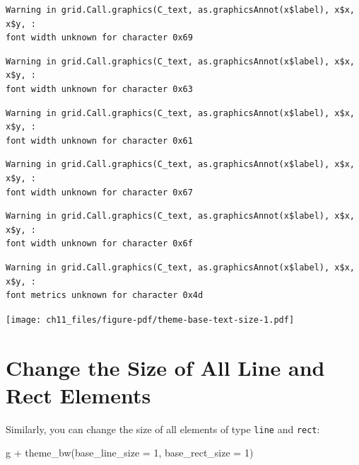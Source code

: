 \documentclass[
  letterpaper,
]{scrbook}
\newenvironment{Shaded}{\begin{snugshade}}{\end{snugshade}}
\newcommand{\AttributeTok}[1]{\textcolor[rgb]{0.40,0.45,0.13}{#1}}
\newcommand{\DecValTok}[1]{\textcolor[rgb]{0.68,0.00,0.00}{#1}}
\newcommand{\FunctionTok}[1]{\textcolor[rgb]{0.28,0.35,0.67}{#1}}
\newcommand{\NormalTok}[1]{\textcolor[rgb]{0.00,0.23,0.31}{#1}}
\newcommand{\SpecialCharTok}[1]{\textcolor[rgb]{0.37,0.37,0.37}{#1}}
\begin{document}
\begin{verbatim}
Warning in grid.Call.graphics(C_text, as.graphicsAnnot(x$label), x$x, x$y, :
font width unknown for character 0x69
\end{verbatim}

\begin{verbatim}
Warning in grid.Call.graphics(C_text, as.graphicsAnnot(x$label), x$x, x$y, :
font width unknown for character 0x63
\end{verbatim}

\begin{verbatim}
Warning in grid.Call.graphics(C_text, as.graphicsAnnot(x$label), x$x, x$y, :
font width unknown for character 0x61
\end{verbatim}

\begin{verbatim}
Warning in grid.Call.graphics(C_text, as.graphicsAnnot(x$label), x$x, x$y, :
font width unknown for character 0x67
\end{verbatim}

\begin{verbatim}
Warning in grid.Call.graphics(C_text, as.graphicsAnnot(x$label), x$x, x$y, :
font width unknown for character 0x6f
\end{verbatim}

\begin{verbatim}
Warning in grid.Call.graphics(C_text, as.graphicsAnnot(x$label), x$x, x$y, :
font metrics unknown for character 0x4d
\end{verbatim}

\texttt{[image: ch11\_files/figure-pdf/theme-base-text-size-1.pdf]}

\section{Change the Size of All Line and Rect
Elements}\label{change-the-size-of-all-line-and-rect-elements}

Similarly, you can change the size of all elements of type \texttt{line}
and \texttt{rect}:

\begin{Shaded}
\begin{Highlighting}[]
\NormalTok{g }\SpecialCharTok{+} \FunctionTok{theme\_bw}\NormalTok{(}\AttributeTok{base\_line\_size =} \DecValTok{1}\NormalTok{, }\AttributeTok{base\_rect\_size =} \DecValTok{1}\NormalTok{)}
\end{Highlighting}
\end{Shaded}
\end{document}
